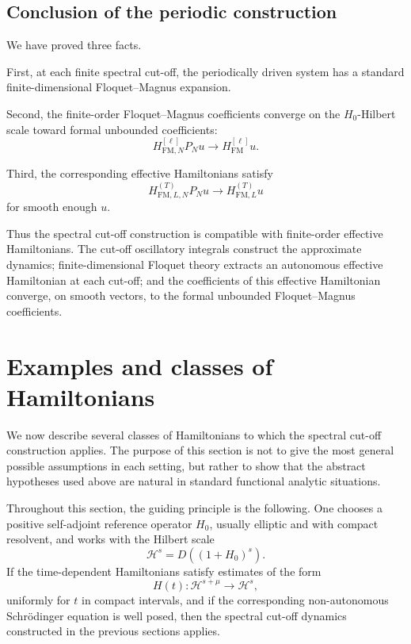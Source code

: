 \documentclass[11pt]{amsart}
\theoremstyle{plain}
\theoremstyle{definition}
\theoremstyle{remark}
\newcommand{\Hilb}{\mathcal H}
\begin{document}
\subsection{Conclusion of the periodic construction}

We have proved three facts.

First, at each finite spectral cut-off, the periodically driven system
has a standard finite-dimensional Floquet--Magnus expansion.

Second, the finite-order Floquet--Magnus coefficients converge on the
\(H_0\)-Hilbert scale toward formal unbounded coefficients:
\[
        H_{\mathrm{FM},N}^{[\ell]}P_Nu
        \longrightarrow
        H_{\mathrm{FM}}^{[\ell]}u.
\]

Third, the corresponding effective Hamiltonians satisfy
\[
        H_{\mathrm{FM},L,N}^{(T)}P_Nu
        \longrightarrow
        H_{\mathrm{FM},L}^{(T)}u
\]
for smooth enough \(u\).

Thus the spectral cut-off construction is compatible with finite-order
effective Hamiltonians.  The cut-off oscillatory integrals construct
the approximate dynamics; finite-dimensional Floquet theory extracts an
autonomous effective Hamiltonian at each cut-off; and the coefficients
of this effective Hamiltonian converge, on smooth vectors, to the
formal unbounded Floquet--Magnus coefficients.
\section{Examples and classes of Hamiltonians}
\label{sec:examples}

We now describe several classes of Hamiltonians to which the spectral
cut-off construction applies.  The purpose of this section is not to
give the most general possible assumptions in each setting, but rather
to show that the abstract hypotheses used above are natural in standard
functional analytic situations.

Throughout this section, the guiding principle is the following.  One
chooses a positive self-adjoint reference operator \(H_0\), usually
elliptic and with compact resolvent, and works with the Hilbert scale
\[
        \Hilb^s=D((1+H_0)^s).
\]
If the time-dependent Hamiltonians satisfy estimates of the form
\[
        H(t):\Hilb^{s+\mu}\longrightarrow \Hilb^s,
\]
uniformly for \(t\) in compact intervals, and if the corresponding
non-autonomous Schr\"odinger equation is well posed, then the spectral
cut-off dynamics constructed in the previous sections applies.
\end{document}
